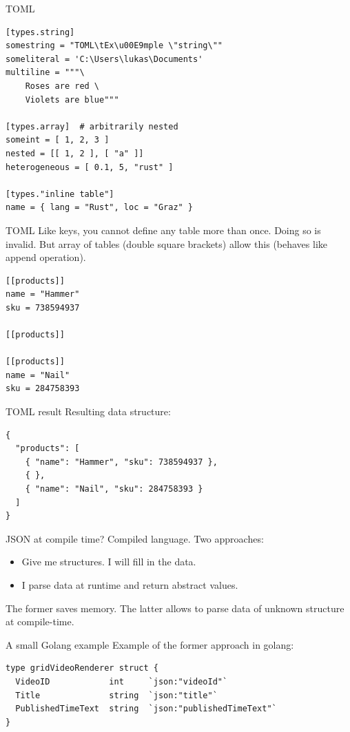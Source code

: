 \documentclass{beamer}
\begin{document}
\begin{frame}[fragile]{TOML}
  \begin{verbatim}
[types.string]
somestring = "TOML\tEx\u00E9mple \"string\""
someliteral = 'C:\Users\lukas\Documents'
multiline = """\
    Roses are red \
    Violets are blue"""

[types.array]  # arbitrarily nested
someint = [ 1, 2, 3 ]
nested = [[ 1, 2 ], [ "a" ]]
heterogeneous = [ 0.1, 5, "rust" ]

[types."inline table"]
name = { lang = "Rust", loc = "Graz" }
  \end{verbatim}
\end{frame}

\begin{frame}[fragile]{TOML}
  Like keys, you cannot define any table more than once. Doing so is invalid.
  But array of tables (double square brackets) allow this (behaves like append operation).
  \begin{verbatim}
[[products]]
name = "Hammer"
sku = 738594937

[[products]]

[[products]]
name = "Nail"
sku = 284758393
  \end{verbatim}
\end{frame}

\begin{frame}[fragile]{TOML result}
  Resulting data structure:
  \begin{verbatim}
{
  "products": [
    { "name": "Hammer", "sku": 738594937 },
    { },
    { "name": "Nail", "sku": 284758393 }
  ]
}
  \end{verbatim}
\end{frame}

\begin{frame}[fragile]{JSON at compile time?}
  Compiled language. Two approaches:
  \begin{itemize}
    \item Give me structures. I will fill in the data.
    \item I parse data at runtime and return abstract values.
  \end{itemize}
  The former saves memory. The latter allows to parse data of unknown structure at compile-time.
\end{frame}

\begin{frame}[fragile]{A small Golang example}
  Example of the former approach in golang:
  \begin{verbatim}
type gridVideoRenderer struct {
  VideoID            int     `json:"videoId"`
  Title              string  `json:"title"`
  PublishedTimeText  string  `json:"publishedTimeText"`
}
  \end{verbatim}
\end{frame}
\end{document}
